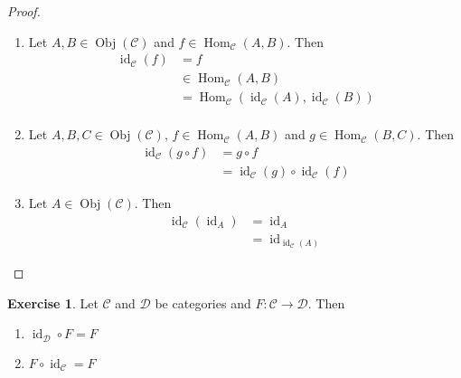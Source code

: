 \documentclass{book}
\theoremstyle{definition}
\newtheorem{ex}[definition]{Exercise}
\newcommand{\MC}{\mathcal{C}}
\newcommand{\MD}{\mathcal{D}}
\newcommand{\lex}[1]{\label{ex:#1}}
\DeclareMathOperator{\id}{id}
\DeclareMathOperator{\Obj}{Obj}
\DeclareMathOperator{\Hom}{Hom}
\DeclareMathOperator*{\0}{\mbf{0}}
\DeclareMathOperator*{\1}{\mbf{1}}
\begin{document}
	\begin{proof}\
		\begin{enumerate}
			\item Let $A, B \in \Obj(\MC)$ and $f \in \Hom_{\MC}(A,B)$. Then 
			\begin{align*}
				\id_{\MC}(f) 
				& = f \\
				& \in \Hom_{\MC}(A, B) \\
				& = \Hom_{\MC}(\id_{\MC}(A), \id_{\MC}(B)) \\
			\end{align*}
			\item Let $A,B, C \in \Obj(\MC)$, $f \in \Hom_{\MC}(A,B)$ and $g \in \Hom_{\MC}(B, C)$. Then 
			\begin{align*}
				\id_{\MC}(g \circ f) 
				& = g \circ f \\
				& = \id_{\MC}(g) \circ \id_{\MC} (f)
			\end{align*}
			\item Let $A \in \Obj(\MC)$. Then 
			\begin{align*}
				\id_{\MC}(\id_{A})
				& = \id_A \\
				& = \id_{\id_{\MC}(A)}
			\end{align*}
		\end{enumerate}
	\end{proof}

	\begin{ex} \lex{13006}
		Let $\MC$ and $\MD$ be categories and $F:\MC \rightarrow \MD$. Then 
		\begin{enumerate}
			\item $\id_{\MD} \circ F = F$
			\item $F \circ \id_{\MC} = F$
		\end{enumerate}
	\end{ex}
\end{document}

